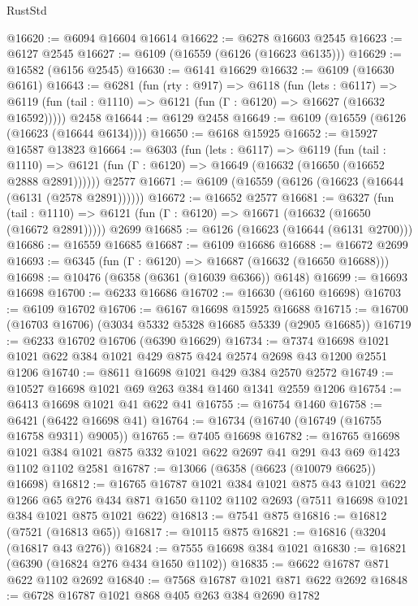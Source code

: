 \begin{lexlean}{RustStd}
\begin{coremodule}
@16620 := @6094 @16604 @16614
@16622 := @6278 @16603 @2545
@16623 := @6127 @2545
@16627 := @6109 (@16559 (@6126 (@16623 @6135)))
@16629 := @16582 (@6156 @2545)
@16630 := @6141 @16629
@16632 := @6109 (@16630 @6161)
@16643 := @6281
    (fun (rty : @917) =>
    @6118
      (fun (lets : @6117) =>
      @6119 (fun (tail : @1110) => @6121 (fun (Γ : @6120) => @16627 (@16632 @16592)))))
    @2458
@16644 := @6129 @2458
@16649 := @6109 (@16559 (@6126 (@16623 (@16644 @6134))))
@16650 := @6168 @15925
@16652 := @15927 @16587 @13823
@16664 := @6303
    (fun (lets : @6117) =>
    @6119
      (fun (tail : @1110) =>
      @6121 (fun (Γ : @6120) => @16649 (@16632 (@16650 (@16652 @2888 @2891))))))
    @2577
@16671 := @6109 (@16559 (@6126 (@16623 (@16644 (@6131 (@2578 @2891))))))
@16672 := @16652 @2577
@16681 := @6327
    (fun (tail : @1110) => @6121 (fun (Γ : @6120) => @16671 (@16632 (@16650 (@16672 @2891)))))
    @2699
@16685 := @6126 (@16623 (@16644 (@6131 @2700)))
@16686 := @16559 @16685
@16687 := @6109 @16686
@16688 := @16672 @2699
@16693 := @6345 (fun (Γ : @6120) => @16687 (@16632 (@16650 @16688)))
@16698 := @10476 (@6358 (@6361 (@16039 @6366)) @6148)
@16699 := @16693 @16698
@16700 := @6233 @16686
@16702 := @16630 (@6160 @16698)
@16703 := @6109 @16702
@16706 := @6167 @16698 @15925 @16688
@16715 := @16700 (@16703 @16706) (@3034 @5332 @5328 @16685 @5339 (@2905 @16685))
@16719 := @6233 @16702 @16706 (@6390 @16629)
@16734 := @7374 @16698 @1021 @1021 @622 @384 @1021 @429 @875 @424 @2574 @2698 @43 @1200 @2551 @1206
@16740 := @8611 @16698 @1021 @429 @384 @2570 @2572
@16749 := @10527 @16698 @1021 @69 @263 @384 @1460 @1341 @2559 @1206
@16754 := @6413 @16698 @1021 @41 @622 @41
@16755 := @16754 @1460
@16758 := @6421 (@6422 @16698 @41)
@16764 := @16734 (@16740 (@16749 (@16755 @16758 @9311) @9005))
@16765 := @7405 @16698
@16782 := @16765
    @16698
    @1021
    @384
    @1021
    @875
    @332
    @1021
    @622
    @2697
    @41
    @291
    @43
    @69
    @1423
    @1102
    @1102
    @2581
@16787 := @13066 (@6358 (@6623 (@10079 @6625)) @16698)
@16812 := @16765
    @16787
    @1021
    @384
    @1021
    @875
    @43
    @1021
    @622
    @1266
    @65
    @276
    @434
    @871
    @1650
    @1102
    @1102
    @2693
    (@7511 @16698 @1021 @384 @1021 @875 @1021 @622)
@16813 := @7541 @875
@16816 := @16812 (@7521 (@16813 @65))
@16817 := @10115 @875
@16821 := @16816 (@3204 (@16817 @43 @276))
@16824 := @7555 @16698 @384 @1021
@16830 := @16821 (@6390 (@16824 @276 @434 @1650 @1102))
@16835 := @6622 @16787 @871 @622 @1102 @2692
@16840 := @7568 @16787 @1021 @871 @622 @2692
@16848 := @6728 @16787 @1021 @868 @405 @263 @384 @2690 @1782

\end{coremodule}
\end{lexlean}
